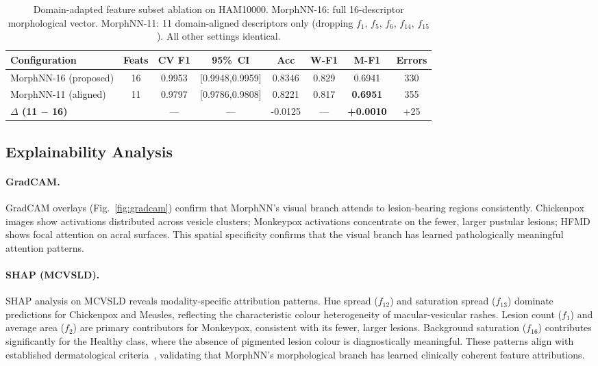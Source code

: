 \documentclass[preprint,12pt]{elsarticle}
\begin{document}
\begin{table}[htbp]
\centering
\caption{Domain-adapted feature subset ablation on HAM10000.
  MorphNN-16: full 16-descriptor morphological vector.
  MorphNN-11: 11 domain-aligned descriptors only
  (dropping $f_1$, $f_5$, $f_6$, $f_{14}$, $f_{15}$).
  All other settings identical.}
\label{tab:feat11}
\setlength{\tabcolsep}{4.5pt}
\renewcommand{\arraystretch}{1.12}
\begin{tabular}{lccccccc}
\toprule
\textbf{Configuration} & \textbf{Feats} &
  \textbf{CV F1} & \textbf{95\%~CI} &
  \textbf{Acc} & \textbf{W-F1} & \textbf{M-F1} &
  \textbf{Errors} \\
\midrule
MorphNN-16 (proposed) & 16 &
  0.9953 & [0.9948,0.9959] &
  0.8346 & 0.829 & 0.6941 & 330 \\
MorphNN-11 (aligned) & 11 &
  0.9797 & [0.9786,0.9808] &
  0.8221 & 0.817 & \textbf{0.6951} & 355 \\
\midrule
\multicolumn{2}{l}{\textbf{$\Delta$ (11 $-$ 16)}} &
  --- & --- &
  -0.0125 & --- & \textbf{+0.0010} & +25 \\
\bottomrule
\end{tabular}
\end{table}


\subsection{Explainability Analysis}
\label{sec:explain_results}

\paragraph{GradCAM.}
GradCAM overlays (Fig.~\ref{fig:gradcam}) confirm that MorphNN's visual
branch attends to lesion-bearing regions consistently.  Chickenpox
images show activations distributed across vesicle clusters; Monkeypox
activations concentrate on the fewer, larger pustular lesions; HFMD
shows focal attention on acral surfaces.  This spatial specificity
confirms that the visual branch has learned pathologically meaningful
attention patterns.

\paragraph{SHAP (MCVSLD).}
SHAP analysis on MCVSLD reveals modality-specific attribution patterns.  Hue
spread ($f_{12}$) and saturation spread ($f_{13}$) dominate predictions
for Chickenpox and Measles, reflecting the characteristic colour
heterogeneity of macular-vesicular rashes.  Lesion count ($f_1$) and
average area ($f_2$) are primary contributors for Monkeypox, consistent
with its fewer, larger lesions.  Background saturation ($f_{16}$)
contributes significantly for the Healthy class, where the absence of
pigmented lesion colour is diagnostically meaningful.  These patterns
align with established dermatological criteria~\cite{[dermatology_ref]},
validating that MorphNN's morphological branch has learned clinically
coherent feature attributions.
\end{document}
